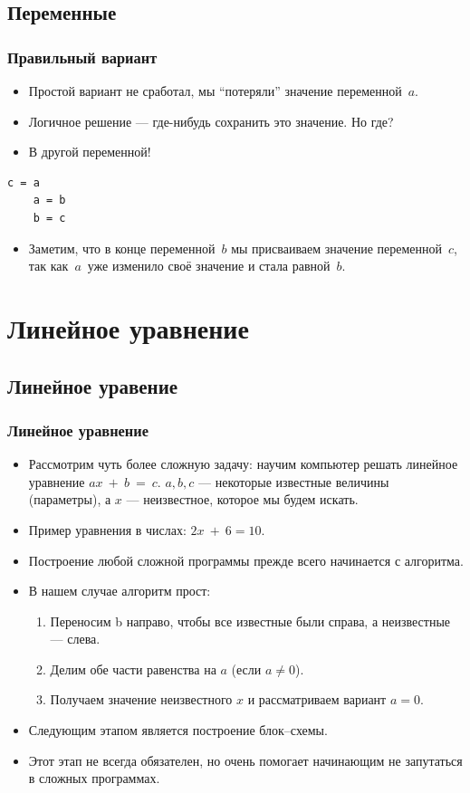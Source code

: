 \documentclass[compress,red]{beamer}
\begin{document}
\subsection{Переменные}
\begin{frame}[fragile]
  \frametitle{Правильный вариант}
  \begin{itemize}
    \item Простой вариант не сработал, мы ``потеряли'' значение переменной~$a$.
    \item Логичное решение --- где-нибудь сохранить это значение. Но где?
    \item В другой переменной!
  \end{itemize}
  \begin{lstlisting}[label=ruby4,caption=Правильный вариант]
    c = a
    a = b
    b = c
  \end{lstlisting}
  \begin{itemize}
    \item Заметим, что в конце переменной~$b$ мы присваиваем значение переменной~$c$, так как~$a$~уже изменило своё значение и стала равной~$b$.
  \end{itemize}
\end{frame}

\section{Линейное уравнение}
\subsection{Линейное уравение}
\begin{frame}[fragile]
  \frametitle{Линейное уравнение}
  \begin{itemize}
    \item Рассмотрим чуть более сложную задачу: научим компьютер решать линейное уравнение $ax~+~b~=~c$. $a,b,c$ --- некоторые известные величины (параметры), а $x$ --- неизвестное, которое мы будем искать.
    \item Пример уравнения в числах: $2x~+~6 = 10$.
    \item Построение любой сложной программы прежде всего начинается с алгоритма.
    \item В нашем случае алгоритм прост:
      \begin{enumerate}
        \item Переносим b направо, чтобы все известные были справа, а неизвестные --- слева.
        \item Делим обе части равенства на $a$ (если $a \neq 0$).
        \item Получаем значение неизвестного $x$ и рассматриваем вариант $a = 0$.
      \end{enumerate}
    \item Следующим этапом является построение блок--схемы.
    \item Этот этап не всегда обязателен, но очень помогает начинающим не запутаться в сложных программах.
  \end{itemize}
\end{frame}
\end{document}
